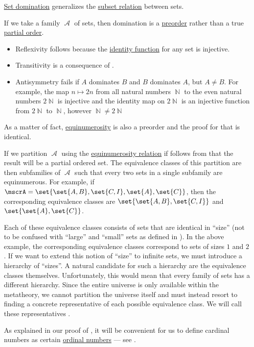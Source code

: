 \begin{remark}\label{rem:cardinal_definition}
  \hyperref[def:equinumerosity]{Set domination} generalizes the \hyperref[def:subset]{subset relation} between sets.

  If we take a family \( \mscrA \) of sets, then domination is a \hyperref[def:preordered_set]{preorder} rather than a true \hyperref[def:partially_ordered_set]{partial order}.
  \begin{itemize}
    \item Reflexivity follows because the \hyperref[def:multi_valued_function/identity]{identity function} for any set is injective.
    \item Transitivity is a consequence of .
    \item Antisymmetry fails if \( A \) dominates \( B \) and \( B \) dominates \( A \), but \( A \neq B \). For example, the map \( n \mapsto 2n \) from all natural numbers \( \BbbN \) to the even natural numbers \( 2\BbbN \) is injective and the identity map on \( 2\BbbN \) is an injective function from \( 2\BbbN \) to \( \BbbN \), however \( \BbbN \neq 2\BbbN \)
  \end{itemize}

  As a matter of fact, \hyperref[def:equinumerosity]{equinumerosity} is also a preorder and the proof for that is identical.

  If we partition \( \mscrA \) using the \hyperref[def:equinumerosity]{equinumerosity relation} if follows from  that the result will be a partial ordered set. The equivalence classes of this partition are then subfamilies of \( \mscrA \) such that every two sets in a single subfamily are equinumerous. For example, if \( \mscrA = \set{ \set{ A, B }, \set{ C, I }, \set{ A }, \set{ C } } \), then the corresponding equivalence classes are \( \set{ \set{ A, B }, \set{ C, I } } \) and \( \set{ \set{ A }, \set{ C } } \).

  Each of these equivalence classes consists of sets that are identical in \enquote{size} (not to be confused with \enquote{large} and \enquote{small} sets as defined in ). In the above example, the corresponding equivalence classes correspond to sets of sizes \( 1 \) and \( 2 \). If we want to extend this notion of \enquote{size} to infinite sets, we must introduce a hierarchy of \enquote{sizes}. A natural candidate for such a hierarchy are the equivalence classes themselves. Unfortunately, this would mean that every family of sets has a different hierarchy. Since the entire universe is only available within the metatheory, we cannot partition the universe itself and must instead resort to finding a concrete representative of each possible equivalence class. We will call these representatives .

  As explained in our proof of , it will be convenient for us to define cardinal numbers as certain \hyperref[def:ordinal]{ordinal numbers} --- see .
\end{remark}

